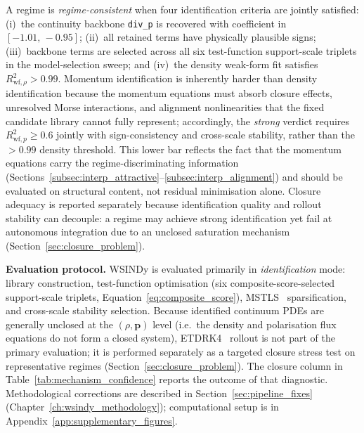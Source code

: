 A regime is \emph{regime-consistent} when four identification criteria
are jointly satisfied:
(i)~the continuity backbone \texttt{div\_p} is recovered with coefficient
in $[-1.01,\,-0.95]$;
(ii)~all retained terms have physically plausible signs;
(iii)~backbone terms are selected across all six test-function
support-scale triplets in the model-selection sweep; and
(iv)~the density weak-form fit satisfies
$R^2_{\mathrm{wf},\rho} > 0.99$.
Momentum identification is inherently harder than density identification
because the momentum equations must absorb closure effects, unresolved
Morse interactions, and alignment nonlinearities that the fixed candidate
library cannot fully represent; accordingly, the \emph{strong} verdict
requires $R^2_{\mathrm{wf},p} \ge 0.6$ jointly with sign-consistency and
cross-scale stability, rather than the $> 0.99$ density threshold.  This
lower bar reflects the fact that the momentum equations carry the
regime-discriminating information
(Sections~\ref{subsec:interp_attractive}--\ref{subsec:interp_alignment})
and should be evaluated on structural content, not residual minimisation
alone.
Closure adequacy is reported separately because identification quality and
rollout stability can decouple: a regime may achieve strong identification
yet fail at autonomous integration due to an unclosed saturation mechanism
(Section~\ref{sec:closure_problem}).

\label{sec:wsindy_experimental_design}
\noindent\textbf{Evaluation protocol.}
WSINDy is evaluated primarily in \emph{identification} mode: library
construction, test-function optimisation (six composite-score-selected
support-scale triplets, Equation~\ref{eq:composite_score}), MSTLS~\cite{minor2025mstls} sparsification, and cross-scale
stability selection.  Because identified continuum PDEs are generally
unclosed at the $(\rho,\mathbf{p})$ level (i.e.\ the density and
polarisation flux equations do not form a closed system),
ETDRK4~\cite{kassam2005etdrk4} rollout
is not part of the primary evaluation; it is performed separately as a
targeted closure stress test on representative regimes
(Section~\ref{sec:closure_problem}).  The closure column in
Table~\ref{tab:mechanism_confidence} reports the outcome of that
diagnostic.  Methodological corrections are described in
Section~\ref{sec:pipeline_fixes} (Chapter~\ref{ch:wsindy_methodology});
computational setup is in Appendix~\ref{app:supplementary_figures}.


